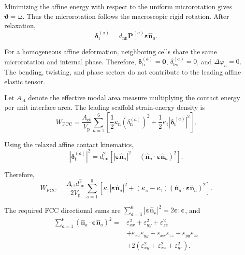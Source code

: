 Minimizing the affine energy with respect to the uniform microrotation gives $\boldsymbol{\vartheta}=\boldsymbol{\omega}$. Thus the microrotation follows the macroscopic rigid rotation. After relaxation,
\begin{equation}
    \boldsymbol{\delta}_{\mathrm{t}}^{(a)} = d_{\mathrm{nn}} \mathbf{P}_\perp^{(a)} \boldsymbol{\varepsilon}\hat{\mathbf{n}}_a.
\end{equation}

For a homogeneous affine deformation, neighboring cells share the same microrotation and internal phase. Therefore, $\boldsymbol{\delta}_{\mathrm{b}}^{(a)}=\mathbf{0}$, $\delta_{\mathrm{tw}}^{(a)}=0$, and $\Delta\varphi_a=0$. The bending, twisting, and phase sectors do not contribute to the leading affine elastic tensor.

Let $A_{\mathrm{ct}}$ denote the effective modal area measure multiplying the contact energy per unit interface area. The leading scaffold strain-energy density is
\begin{equation}
    W_{\mathrm{FCC}} = \frac{A_{\mathrm{ct}}}{V_{\mathrm{p}}} \sum_{a=1}^{6} \left[ \frac{1}{2}\kappa_{\mathrm{n}} (\delta_{\mathrm{n}}^{(a)})^2 + \frac{1}{2}\kappa_{\mathrm{t}} |\boldsymbol{\delta}_{\mathrm{t}}^{(a)}|^2 \right].
\end{equation}

Using the relaxed affine contact kinematics,
\begin{equation}
    |\boldsymbol{\delta}_{\mathrm{t}}^{(a)}|^2 = d_{\mathrm{nn}}^2 \left[ |\boldsymbol{\varepsilon}\hat{\mathbf{n}}_a|^2 - (\hat{\mathbf{n}}_a\cdot \boldsymbol{\varepsilon} \hat{\mathbf{n}}_a)^2 \right].
\end{equation}

Therefore,
\begin{equation}
    W_{\mathrm{FCC}} = \frac{A_{\mathrm{ct}}d_{\mathrm{nn}}^2}{2V_{\mathrm{p}}} \sum_{a=1}^{6} \left[ \kappa_{\mathrm{t}} |\boldsymbol{\varepsilon}\hat{\mathbf{n}}_a|^2 + (\kappa_{\mathrm{n}}-\kappa_{\mathrm{t}}) (\hat{\mathbf{n}}_a\cdot \boldsymbol{\varepsilon} \hat{\mathbf{n}}_a)^2 \right].
\end{equation}

The required FCC directional sums are $\sum_{a=1}^{6} |\boldsymbol{\varepsilon}\hat{\mathbf{n}}_a|^2 = 2\boldsymbol{\varepsilon}:\boldsymbol{\varepsilon}$, and
\begin{equation}
\begin{aligned}
    \sum_{a=1}^{6} (\hat{\mathbf{n}}_a\cdot \boldsymbol{\varepsilon} \hat{\mathbf{n}}_a)^2 ={}& \varepsilon_{xx}^2 + \varepsilon_{yy}^2 + \varepsilon_{zz}^2 \\
    & + \varepsilon_{xx}\varepsilon_{yy} + \varepsilon_{xx}\varepsilon_{zz} + \varepsilon_{yy}\varepsilon_{zz} \\
    & + 2(\varepsilon_{xy}^2+\varepsilon_{xz}^2+\varepsilon_{yz}^2).
\end{aligned}
\end{equation}

